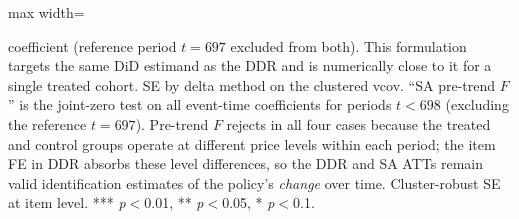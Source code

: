 \begin{table}[htbp]
\begin{adjustbox}{max width=\textwidth}
\begin{threeparttable}
\begin{tablenotes}
coefficient (reference period $t=697$ excluded from both).
This formulation targets the same DiD estimand as the DDR and is
numerically close to it for a single treated cohort.
SE by delta method on the clustered vcov.
``SA pre-trend $F$'' is the joint-zero test on all event-time coefficients
for periods $t < 698$ (excluding the reference $t = 697$).
Pre-trend $F$ rejects in all four cases because the treated and control
groups operate at different price levels within each period; the item FE
in DDR absorbs these level differences, so the DDR and SA ATTs remain valid
identification estimates of the policy's \emph{change} over time.
Cluster-robust SE at item level.
*** \textit{p}$<$0.01, ** \textit{p}$<$0.05, * \textit{p}$<$0.1.
\end{tablenotes}
\end{threeparttable}
\end{adjustbox}
\end{table}
